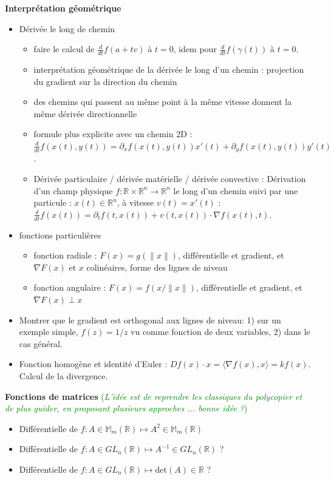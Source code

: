 \documentclass[11pt,a4paper]{article}
\begin{document}
{\noindent
\textbf{Interprétation géométrique} 
\begin{itemize} 
    \item Dérivée le long de chemin
    \begin{itemize}
        \item faire le calcul de $\frac{d}{dt} f(a + t v)$ à $t=0$, idem pour $\frac{d}{dt} f(\gamma(t))$ à $t=0$. 
        \item interprétation géométrique de la dérivée le long d'un chemin : projection du gradient sur la direction du chemin 
        \item des chemins qui passent au même point à la même vitesse donnent la même dérivée directionnelle  
        \item formule plus explicite avec un chemin 2D : $\frac{d}{dt} f(x(t), y(t)) = \partial_x f(x(t), y(t)) x'(t) + \partial_y f(x(t), y(t)) y'(t)$. 
        \item Dérivée particulaire / dérivée matérielle / dérivée convective : Dérivation d'un champ physique $f : \mathbb R \times \mathbb R^n \to \mathbb R^n$ le long d'un chemin suivi par une particule : $x(t) \in \mathbb R^n$, à vitesse $v(t) = x'(t)$ : $\frac{d}{dt} f(x(t)) = \partial_t f(t, x(t)) + v(t, x(t)) \cdot \nabla f(x(t), t)$. 
    \end{itemize}
    \item fonctions particulières 
    \begin{itemize}
        \item fonction radiale : $F(x) = g(\| x \|)$, différentielle et gradient, et $\nabla F(x)$ et $x$ colinéaires, forme des lignes de niveau 
        \item fonction angulaire : $F(x) = f(x / \| x \|)$, différentielle et gradient, et $\nabla F(x) \perp x$
    \end{itemize}
    \item Montrer que le gradient est orthogonal aux lignes de niveau: 1) sur un exemple simple, $f(z) = 1 / z$ vu comme fonction de deux variables, 2) dans le cas général. 
    \item Fonction homogène et identité d'Euler : $Df(x) \cdot x = \langle \nabla f(x), x\rangle = k f(x)$. Calcul de la divergence. 
\end{itemize} 

\noindent 
\textbf{Fonctions de matrices} 
\textcolor{Green}{(\emph{L'idée est de reprendre les classiques du polycopier et de plus guider, en proposant plusieurs approches ... bonne idée ?})}
\begin{itemize}
    \item Différentielle de $f : A \in \mathbb M_m(\mathbb R) \mapsto A^2 \in \mathbb M_m(\mathbb R)$
    \item Différentielle de $f : A \in GL_n(\mathbb R) \mapsto A^{-1} \in GL_n(\mathbb R)$ ? 
    \item Différentielle de $f : A \in GL_n(\mathbb R) \mapsto \mathrm{det}(A) \in \mathbb R$ ? 
\end{itemize}

}
\end{document}
